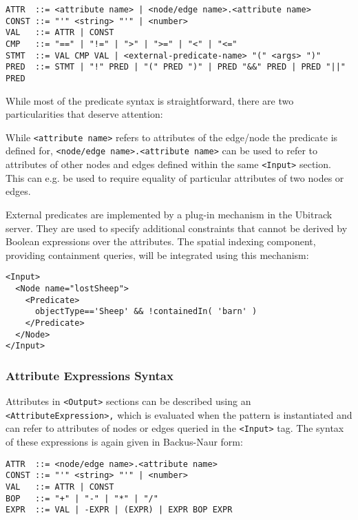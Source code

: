 \documentclass[11pt]{article}
\begin{document}
\begin{Verbatim}[fontsize=\footnotesize,tabsize=2] 
ATTR  ::= <attribute name> | <node/edge name>.<attribute name>
CONST ::= "'" <string> "'" | <number>
VAL   ::= ATTR | CONST
CMP   ::= "==" | "!=" | ">" | ">=" | "<" | "<="
STMT  ::= VAL CMP VAL | <external-predicate-name> "(" <args> ")" 
PRED  ::= STMT | "!" PRED | "(" PRED ")" | PRED "&&" PRED | PRED "||" PRED
\end{Verbatim} 

While most of the predicate syntax is
straightforward, there are two particularities that deserve attention:

While \texttt{<attribute name>} refers to attributes of the edge/node the predicate is defined for,
\texttt{<node/edge name>.<attribute name>} can be used to refer to attributes of other nodes and edges defined within the same 
\texttt{<Input>} section. This can e.g. be used to require equality of particular
attributes of two nodes or edges.

External predicates are implemented by a
plug-in mechanism in the Ubitrack server. They are used to specify additional
constraints that cannot be derived by Boolean expressions over the attributes.
The spatial indexing component, providing containment queries, will be
integrated using this mechanism: 

\begin{Verbatim}[fontsize=\footnotesize,tabsize=2] 
<Input>
  <Node name="lostSheep">
    <Predicate> 
      objectType=='Sheep' && !containedIn( 'barn' ) 
    </Predicate>
  </Node>
</Input>
\end{Verbatim} 

\subsubsection{Attribute Expressions Syntax}

Attributes in \texttt{<Output>} sections can be described using an \texttt{<Attribute\-Ex\-pres\-sion>,} which is
evaluated when the pattern is instantiated and can refer to attributes of
nodes or edges queried in the \texttt{<Input>} tag. The syntax of these expressions is again given in Backus-Naur form:

\begin{Verbatim}[fontsize=\footnotesize,tabsize=2] 
ATTR  ::= <node/edge name>.<attribute name>
CONST ::= "'" <string> "'" | <number>
VAL   ::= ATTR | CONST
BOP   ::= "+" | "-" | "*" | "/"
EXPR  ::= VAL | -EXPR | (EXPR) | EXPR BOP EXPR
\end{Verbatim} 
\end{document}
